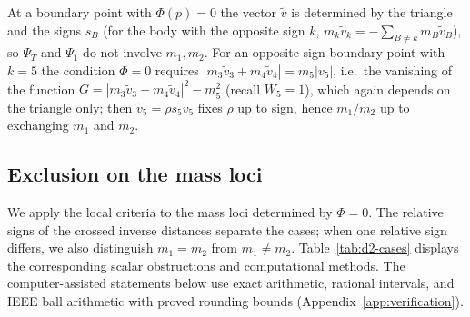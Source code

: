 \documentclass[Threeside,11pt]{article}
\theoremstyle{definition}
\theoremstyle{remark}
\numberwithin{equation}{section}
\theoremstyle{remark}
\begin{document}
At a boundary point with $\Phi(p)=0$ the vector $\tilde v$ is determined by the triangle and the signs
$s_B$ (for the body with the opposite sign $k$, $m_k\tilde v_k=-\sum_{B\ne k}m_B\tilde v_B$), so $\Psi_T$ and
$\Psi_1$ do not involve $m_1,m_2$.  For an opposite-sign boundary point with $k=5$ the condition
$\Phi=0$ requires $|m_3\tilde v_3+m_4\tilde v_4|=m_5|v_5|$, i.e.\ the vanishing of the
function $G=|m_3\tilde v_3+m_4\tilde v_4|^2-m_5^2$ (recall $W_5=1$), which again
depends on the triangle only; then $\tilde v_5=\rho s_5v_5$ fixes $\rho$ up to sign, hence
$m_1/m_2$ up to exchanging $m_1$ and $m_2$.

\subsection{\texorpdfstring{Exclusion on the mass loci}{Exclusion on the mass loci}}\label{sec:d2-cases}

{We apply the local criteria to the mass loci determined by $\Phi=0$.
The relative signs of the crossed inverse distances separate the cases; when one
relative sign differs, we also distinguish $m_1=m_2$ from $m_1\ne m_2$.
Table~\ref{tab:d2-cases} displays the corresponding scalar obstructions and
computational methods. The computer-assisted statements below use exact arithmetic,
rational intervals, and IEEE ball arithmetic with proved rounding bounds
(Appendix~\ref{app:verification}).}
\end{document}
